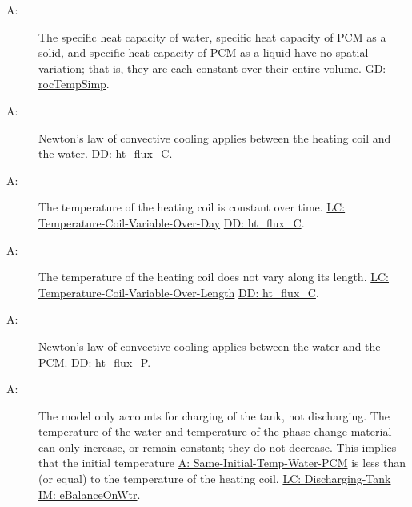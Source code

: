 \documentclass[12pt]{article}
\newcounter{assumpnum}
\newcommand{\atheassumpnum}{A\theassumpnum}
\begin{document}
\begin{description}
\item[\atheassumpnum\label{A:Specific-Heat-Energy-Constant-over-Volume}:]The specific heat capacity of water, specific heat capacity of PCM as a solid, and specific heat capacity of PCM as a liquid have no spatial variation; that is, they are each constant over their entire volume. \hyperref[GD:rocTempSimp]{GD: rocTempSimp}.
\end{description}
\begin{description}
\item[\atheassumpnum\label{A:Newton-Law-Convective-Cooling-Coil-Water}:]Newton's law of convective cooling applies between the heating coil and the water. \hyperref[DD:ht.flux.C]{DD: ht\_flux\_C}.
\end{description}
\begin{description}
\item[\atheassumpnum\label{A:Temp-Heating-Coil-Constant-over-Time}:]The temperature of the heating coil is constant over time. \hyperref[likeChgTCVOD]{LC: Temperature-Coil-Variable-Over-Day} \hyperref[DD:ht.flux.C]{DD: ht\_flux\_C}.
\end{description}
\begin{description}
\item[\atheassumpnum\label{A:Temp-Heating-Coil-Constant-over-Length}:]The temperature of the heating coil does not vary along its length. \hyperref[likeChgTCVOL]{LC: Temperature-Coil-Variable-Over-Length} \hyperref[DD:ht.flux.C]{DD: ht\_flux\_C}.
\end{description}
\begin{description}
\item[\atheassumpnum\label{A:Law-Convective-Cooling-Water-PCM}:]Newton's law of convective cooling applies between the water and the PCM. \hyperref[DD:ht.flux.P]{DD: ht\_flux\_P}.
\end{description}
\begin{description}
\item[\atheassumpnum\label{A:Charging-Tank-No-Temp-Discharge}:]The model only accounts for charging of the tank, not discharging. The temperature of the water and temperature of the phase change material can only increase, or remain constant; they do not decrease. This implies that the initial temperature \hyperref[A:Same-Initial-Temp-Water-PCM]{A: Same-Initial-Temp-Water-PCM} is less than (or equal) to the temperature of the heating coil. \hyperref[likeChgDT]{LC: Discharging-Tank} \hyperref[IM:eBalanceOnWtr]{IM: eBalanceOnWtr}.
\end{description}
\end{document}
